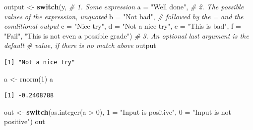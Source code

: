 \documentclass[
]{book}
\newenvironment{Shaded}{\begin{snugshade}}{\end{snugshade}}
\newcommand{\AttributeTok}[1]{\textcolor[rgb]{0.77,0.63,0.00}{#1}}
\newcommand{\CommentTok}[1]{\textcolor[rgb]{0.56,0.35,0.01}{\textit{#1}}}
\newcommand{\ControlFlowTok}[1]{\textcolor[rgb]{0.13,0.29,0.53}{\textbf{#1}}}
\newcommand{\DecValTok}[1]{\textcolor[rgb]{0.00,0.00,0.81}{#1}}
\newcommand{\FunctionTok}[1]{\textcolor[rgb]{0.00,0.00,0.00}{#1}}
\newcommand{\NormalTok}[1]{#1}
\newcommand{\OtherTok}[1]{\textcolor[rgb]{0.56,0.35,0.01}{#1}}
\newcommand{\SpecialCharTok}[1]{\textcolor[rgb]{0.00,0.00,0.00}{#1}}
\newcommand{\StringTok}[1]{\textcolor[rgb]{0.31,0.60,0.02}{#1}}
\begin{document}
\begin{Shaded}
\begin{Highlighting}[]
\NormalTok{output }\OtherTok{\textless{}{-}} \ControlFlowTok{switch}\NormalTok{(y,                      }\CommentTok{\# 1. Some expression}
                 \AttributeTok{a =} \StringTok{"Well done"}\NormalTok{,        }\CommentTok{\# 2. The possible values of the expression, unquoted}
                 \AttributeTok{b =} \StringTok{"Not bad"}\NormalTok{,          }\CommentTok{\#    followed by the \textasciigrave{}=\textasciigrave{} and the conditional output}
                 \AttributeTok{c =} \StringTok{"Nice try"}\NormalTok{,}
                 \AttributeTok{d =} \StringTok{"Not a nice try"}\NormalTok{,}
                 \AttributeTok{e =} \StringTok{"This is bad"}\NormalTok{,}
                 \AttributeTok{f =} \StringTok{"Fail"}\NormalTok{,}
                 \StringTok{"This is not even a possible grade"}\NormalTok{) }\CommentTok{\# 3. An optional last argument is the default}
                                                      \CommentTok{\#    value, if there is no match above}
\NormalTok{output}
\end{Highlighting}
\end{Shaded}

\begin{verbatim}
[1] "Not a nice try"
\end{verbatim}

\begin{Shaded}
\begin{Highlighting}[]
\NormalTok{a }\OtherTok{\textless{}{-}} \FunctionTok{rnorm}\NormalTok{(}\DecValTok{1}\NormalTok{)}
\NormalTok{a}
\end{Highlighting}
\end{Shaded}

\begin{verbatim}
[1] -0.2408788
\end{verbatim}

\begin{Shaded}
\begin{Highlighting}[]
\NormalTok{out }\OtherTok{\textless{}{-}} \ControlFlowTok{switch}\NormalTok{(}\FunctionTok{as.integer}\NormalTok{(a }\SpecialCharTok{\textgreater{}} \DecValTok{0}\NormalTok{),}
              \StringTok{\textasciigrave{}}\AttributeTok{1}\StringTok{\textasciigrave{}} \OtherTok{=} \StringTok{"Input is positive"}\NormalTok{,}
              \StringTok{\textasciigrave{}}\AttributeTok{0}\StringTok{\textasciigrave{}} \OtherTok{=} \StringTok{"Input is not positive"}\NormalTok{)}
\NormalTok{out}
\end{Highlighting}
\end{Shaded}
\end{document}

